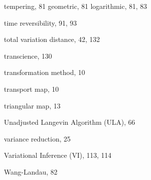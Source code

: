 \begin{theindex}
\indexspace

\item tempering, 81
  \subitem geometric, 81
  \subitem logarithmic, 81, 83
\item time reversibility, 91, 93
\item total variation distance, 42, 132
\item transcience, 130
\item transformation method, 10
\item transport map, 10
\item triangular map, 13

\indexspace

\item Unadjusted Langevin Algorithm (ULA), 66

\indexspace

\item variance reduction, 25
\item Variational Inference (VI), 113, 114

\indexspace

\item Wang-Landau, 82

\end{theindex}
